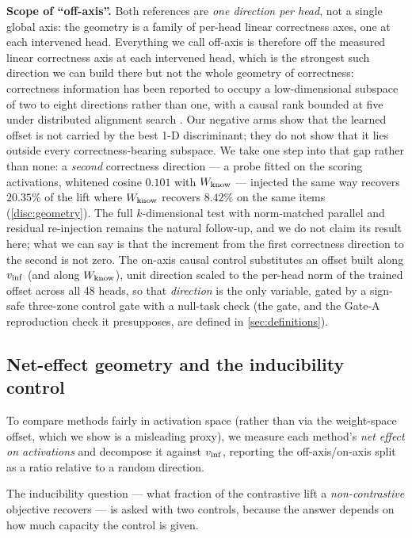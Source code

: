 \textbf{Scope of ``off-axis''.} Both references are \emph{one direction per head}, not
a single global axis: the geometry is a family of per-head linear correctness axes, one
at each intervened head. Everything we call off-axis is therefore off the measured
linear correctness axis at each intervened head, which is the strongest such direction
we can build there but not the whole geometry of correctness: correctness information has been reported to occupy a
low-dimensional subspace of two to eight directions rather than one, with a causal
rank bounded at five under distributed alignment search
\citep{ConfidenceManifold}. Our negative arms show that the learned offset is not
carried by the best 1-D discriminant; they do not show that it lies outside every
correctness-bearing subspace. We take one step into that gap rather than none: a
\emph{second} correctness direction --- a probe fitted on the scoring activations,
whitened cosine $0.101$ with $W_{\mathrm{know}}$ --- injected the same way recovers $20.35\%$
of the lift where $W_{\mathrm{know}}$ recovers $8.42\%$ on the same items
(\cref{disc:geometry}). The full $k$-dimensional test with norm-matched parallel and
residual re-injection remains the natural follow-up, and we do not claim its result
here; what we can say is that the increment from the first correctness direction to
the second is not zero. The on-axis
causal control substitutes an offset built along $v_{\mathrm{inf}}$ (and along $W_{\mathrm{know}}$), unit
direction scaled to the per-head norm of the trained offset across all 48 heads, so
that \emph{direction} is the only variable, gated by a sign-safe three-zone control
gate with a null-task check (the gate, and the Gate-A reproduction check it
presupposes, are defined in \cref{sec:definitions}).

\subsection{Net-effect geometry and the inducibility control}\label{method:neteffect}

To compare methods fairly in activation space (rather than via the weight-space
offset, which we show is a misleading proxy), we measure each method's \emph{net
effect on activations} and decompose it against $v_{\mathrm{inf}}$, reporting the
off-axis/on-axis split as a ratio relative to a random direction.

The inducibility question --- what fraction of the contrastive lift a
\emph{non-contrastive} objective recovers --- is asked with two controls, because the
answer depends on how much capacity the control is given.


